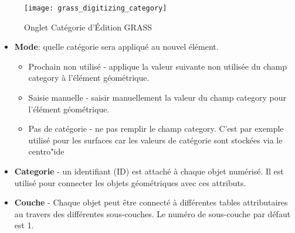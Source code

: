 \begin{figure}[h]
 \begin{center}
  \caption{Onglet Catégorie d'Édition GRASS \nixcaption}\label{fig:grass_digitizing_category}
  \texttt{[image: grass\_digitizing\_category]}
 \end{center}
\end{figure}

\begin{itemize}
\item \textbf{Mode}: quelle catégorie sera appliqué au nouvel élément.
\begin{itemize}
\item Prochain non utilisé - applique la valeur suivante non utilisée du champ category à l'élément géométrique.
\item Saisie manuelle - saisir manuellement la valeur du champ category pour l'élément géométrique.
\item Pas de catégorie - ne pas remplir le champ category. C'est par exemple utilisé pour les surfaces car les valeurs de catégorie sont stockées via le centro"ide
\end{itemize}
\item \textbf{Categorie} - un identifiant (ID) est attaché à chaque objet numérisé. Il est utilisé pour connecter les objets géométriques avec ces attributs.
\item \textbf{Couche} - Chaque objet peut être connecté à différentes tables attributaires au travers des différentes sous-couches. Le numéro de sous-couche par défaut est 1.

\end{itemize}

